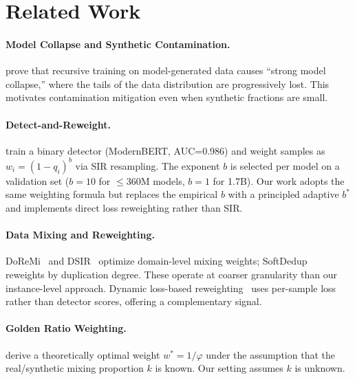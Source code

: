 \documentclass[11pt]{article}
\begin{document}
\section{Related Work}
\label{sec:related}

\paragraph{Model Collapse and Synthetic Contamination.}
\citet{shumailov2024strong} prove that recursive training on model-generated data causes ``strong model collapse,'' where the tails of the data distribution are progressively lost. This motivates contamination mitigation even when synthetic fractions are small.

\paragraph{Detect-and-Reweight.}
\citet{drayson2025contamination} train a binary detector (ModernBERT, AUC=0.986) and weight samples as $w_i=(1-q_i)^b$ via SIR resampling. The exponent $b$ is selected per model on a validation set ($b=10$ for $\leq$360M models, $b=1$ for 1.7B). Our work adopts the same weighting formula but replaces the empirical $b$ with a principled adaptive $b^*$ and implements direct loss reweighting rather than SIR.

\paragraph{Data Mixing and Reweighting.}
DoReMi~\citep{xie2023doremi} and DSIR~\citep{xie2023dsir} optimize domain-level mixing weights; SoftDedup~\citep{abbas2024softdedup} reweights by duplication degree. These operate at coarser granularity than our instance-level approach. Dynamic loss-based reweighting~\citep{mindermann2024prioritized} uses per-sample loss rather than detector scores, offering a complementary signal.

\paragraph{Golden Ratio Weighting.}
\citet{goldenratio2025} derive a theoretically optimal weight $w^*=1/\varphi$ under the assumption that the real/synthetic mixing proportion $k$ is known. Our setting assumes $k$ is unknown.

\end{document}
